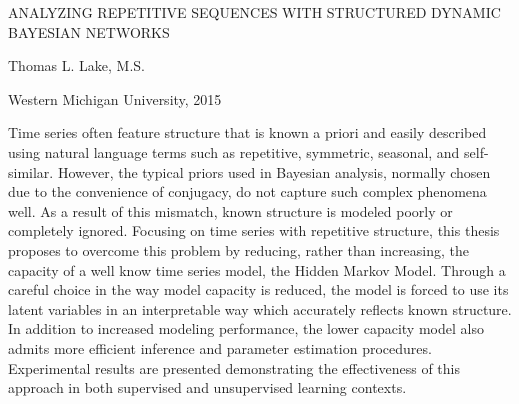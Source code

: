 \thispagestyle{empty}
\begin{center}
    ANALYZING REPETITIVE SEQUENCES WITH STRUCTURED DYNAMIC BAYESIAN NETWORKS

    \vspace{3\baselineskip}
    Thomas L. Lake, M.S.

    \vspace{\baselineskip}
    Western Michigan University, 2015
\end{center}
\vspace{3\baselineskip}
\hspace*{0.5in}
Time series often feature structure that is known a priori and easily described using
natural language terms such as repetitive, symmetric, seasonal, and self-similar.
However, the typical priors used in Bayesian analysis, normally chosen due to the
convenience of conjugacy, do not capture such complex phenomena well.
As a result of this mismatch, known structure is modeled poorly or completely ignored.
Focusing on time series with repetitive structure, this thesis proposes to overcome this
problem by reducing, rather than increasing, the capacity of a well know time series model,
the Hidden Markov Model.
Through a careful choice in the way model capacity is reduced, the model is forced to use
its latent variables in an interpretable way which accurately reflects known structure.
In addition to increased modeling performance, the lower capacity model also admits more
efficient inference and parameter estimation procedures.
Experimental results are presented demonstrating the effectiveness of this approach
in both supervised and unsupervised learning contexts.
\newpage
\restoregeometry
